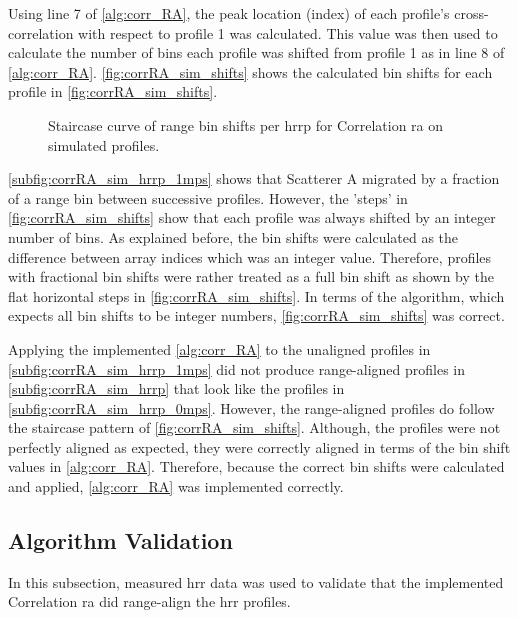 \documentclass[class=report,11pt,crop=false]{standalone}
\begin{document}
    Using line 7 of \autoref{alg:corr_RA}, the peak location (index) of each profile's cross-correlation with respect to profile 1 was calculated. This value was then used to calculate the number of bins each profile was shifted from profile 1 as in line 8 of \autoref{alg:corr_RA}. \autoref{fig:corrRA_sim_shifts} shows the calculated bin shifts for each profile in \autoref{fig:corrRA_sim_shifts}.

    \begin{figure}[H]
        \centering
        \resizebox{0.4\linewidth}{!}{}
        \caption{Staircase curve of range bin shifts per \gls{hrrp} for Correlation \gls{ra} on simulated profiles.\label{fig:corrRA_sim_shifts}}
    \end{figure}

    \autoref{subfig:corrRA_sim_hrrp_1mps} shows that Scatterer A migrated by a fraction of a range bin between successive profiles. However, the 'steps' in \autoref{fig:corrRA_sim_shifts} show that each profile was always shifted by an integer number of bins. As explained before, the bin shifts were calculated as the difference between array indices which was an integer value. Therefore, profiles with fractional bin shifts were rather treated as a full bin shift as shown by the flat horizontal steps in \autoref{fig:corrRA_sim_shifts}. In terms of the algorithm, which expects all bin shifts to be integer numbers, \autoref{fig:corrRA_sim_shifts} was correct.

    Applying the implemented \autoref{alg:corr_RA} to the unaligned profiles in \autoref{subfig:corrRA_sim_hrrp_1mps} did not produce range-aligned profiles in \autoref{subfig:corrRA_sim_hrrp} that look like the profiles in \autoref{subfig:corrRA_sim_hrrp_0mps}. However, the range-aligned profiles do follow the staircase pattern of \autoref{fig:corrRA_sim_shifts}. Although, the profiles were not perfectly aligned as expected, they were correctly aligned in terms of the bin shift values in \autoref{alg:corr_RA}. Therefore, because the correct bin shifts were calculated and applied, \autoref{alg:corr_RA} was implemented correctly.

    \subsection{Algorithm Validation}
    In this subsection, measured \gls{hrr} data was used to validate that the implemented Correlation \gls{ra} did range-align the \gls{hrr} profiles.
    
\end{document}
